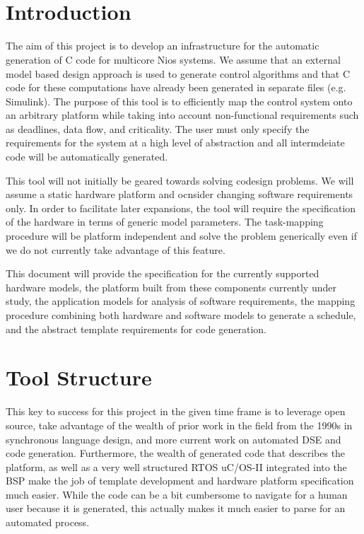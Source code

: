 \documentclass[table,11pt]{article}
\title{
\vspace{2in}
\textmd{\textbf{\hmwkTitle}}\\
\vspace{3in}
}
\author{\textbf{\hmwkAuthorName}}
\date{} %
\begin{document}
\maketitle
\thispagestyle{empty}
\newpage
\setcounter{page}{1}

\section{Introduction}

The aim of this project is to develop an infrastructure for the automatic generation of C code for multicore Nios systems. We assume that an external model based design approach is used to generate control algorithms and that C code for these computations have already been generated in separate files (e.g. Simulink). The purpose of this tool is to efficiently map the control system onto an arbitrary platform while taking into account non-functional requirements such as deadlines, data flow, and criticality. The user must only specify the requirements for the system at a high level of abstraction and all intermdeiate code will be automatically generated. 

This tool will not initially be geared towards solving codesign problems. We will assume a static hardware platform and ocnsider changing software requirements only. In order to facilitate later expansions, the tool will require the specification of the hardware in terms of generic model parameters. The task-mapping procedure will be platform independent and solve the problem generically even if we do not currently take advantage of this feature.

This document will provide the specification for the currently supported hardware models, the platform built from these components currently under study, the application models for analysis of software requirements, the mapping procedure combining both hardware and software models to generate a schedule, and the abstract template requirements for code generation.



\section{Tool Structure}

This key to success for this project in the given time frame is to leverage open source, take advantage of the wealth of prior work in the field from the 1990s in synchronous language design, and more current work on automated DSE and code generation. Furthermore, the wealth of generated code that describes the platform, as well as a very well structured RTOS uC/OS-II integrated into the BSP make the job of template development and hardware platform specification much easier. While the code can be a bit cumbersome to navigate for a human user because it is generated, this actually makes it much easier to parse for an automated process.
\end{document}
